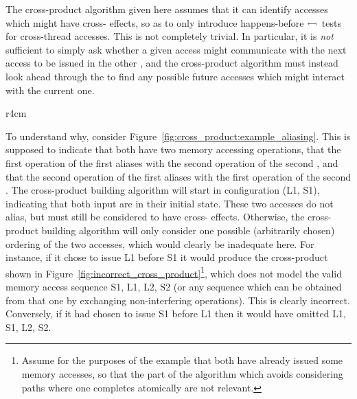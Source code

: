 
The cross-product algorithm given here assumes that it can identify
accesses which might have cross-{\StateMachine} effects, so as to only
introduce happens-before $\leftarrowtail$ tests for cross-thread
accesses.  This is not completely trivial.  In particular, it is
\emph{not} sufficient to simply ask whether a given access might
communicate with the next access to be issued in the other
{\StateMachine}, and the cross-product algorithm must instead look
ahead through the {\StateMachines} to find any possible future
accesses which might interact with the current one.

\begin{wrapfigure}{r}{4cm}
  \caption{An example aliasing and control flow graph.}
  \label{fig:cross_product:example_aliasing}
  \vspace{-10pt}
\end{wrapfigure}

To understand why, consider
Figure~\ref{fig:cross_product:example_aliasing}.  This is supposed to
indicate that both {\StateMachines} have two memory accessing
operations, that the first operation of the first {\StateMachine}
aliases with the second operation of the second {\StateMachine}, and
that the second operation of the first {\StateMachine} aliases with
the first operation of the second {\StateMachine}.  The cross-product
building algorithm will start in configuration (L1, S1), indicating
that both input {\StateMachines} are in their initial state.  These
two accesses do not alias, but must still be considered to have
cross-{\StateMachine} effects.  Otherwise, the cross-product building
algorithm will only consider one possible (arbitrarily chosen)
ordering of the two accesses, which would clearly be inadequate here.
For instance, if it chose to issue L1 before S1 it would produce the
cross-product {\StateMachine} shown in
Figure~\ref{fig:incorrect_cross_product}\footnote{Assume for the
  purposes of the example that both {\StateMachines} have already
  issued some memory accesses, so that the part of the algorithm which
  avoids considering paths where one {\StateMachine} completes
  atomically are not relevant.}, which does not model the valid memory
access sequence S1, L1, L2, S2 (or any sequence which can be obtained
from that one by exchanging non-interfering operations).  This is
clearly incorrect.  Conversely, if it had chosen to issue S1 before L1
then it would have omitted L1, S1, L2, S2.

